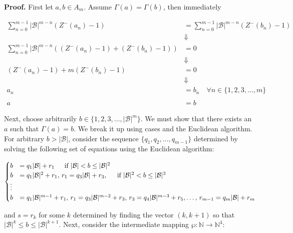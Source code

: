 \documentclass[amsmath,12pt,a4paper]{amsart}
\begin{document}
\textbf{Proof.} First let $a, b \in A_m$. Assume $\Gamma(a) = \Gamma(b)$, then immediately 


\begin{equation}
\begin{split}
\sum_{n=0}^{m-1} |\mathcal{B}|^{m-n} \left( Z^{-}(a_n) - 1 \right) &= \sum_{n=0}^{m-1} |\mathcal{B}|^{m-n} \left( Z^{-}(b_n) - 1 \right) \\
&\Downarrow \\
\sum_{n=0}^{m-1} |\mathcal{B}|^{m-n} \left( (Z^{-}(a_n) - 1) + (Z^{-}(b_n) - 1) \right) &= 0 \\
&\Downarrow \\
(Z^{-}(a_n) - 1) + m (Z^{-}(b_n) - 1) &= 0 \\
&\Downarrow \\
a_n &= b_n \quad \forall n \in \{1, 2, 3, \ldots, m\} \\
\\
a &= b
\end{split}
\end{equation}


Next, choose arbitrarily $b \in \{1, 2, 3, \ldots, |\mathcal{B}|^m\}$. We must show that there exists an $a$ such that $\Gamma(a) = b$. We break it up using cases and the Euclidean algorithm. For arbitrary $b > |\mathcal{B}|$, consider the sequence $\{q_1, q_2, \ldots, q_{m-1}\}$ determined by solving the following set of equations using the Euclidean algorithm:

$$
\begin{cases}
b &= q_1|\mathcal{B}| + r_1 \indent \text{if $|\mathcal{B}| < b \leq |\mathcal{B}|^2$} \\
b& = q_1|\mathcal{B}|^2 + r_1, \, r_1 = q_3|\mathcal{B}| + r_3, \indent \text{if $|\mathcal{B}|^2 < b \leq |\mathcal{B}|^3$} \\
\vdots \\
b &= q_1|\mathcal{B}|^{m-1} + r_1, \, r_1 = q_3|\mathcal{B}|^{m-2} + r_3, \, r_3 = q_4|\mathcal{B}|^{m-3} + r_5, \ldots, \, r_{m-1} = q_m|\mathcal{B}| + r_m
\end{cases}
$$

and $s = r_k$ for some $k$ determined by finding the vector $(k, k + 1)$ so that $|\mathcal{B}|^k \leq b \leq |\mathcal{B}|^{k+1}$. Next, consider the intermediate mapping $\wp : \mathbb{N} \to \mathbb{N}^4$:
\end{document}

